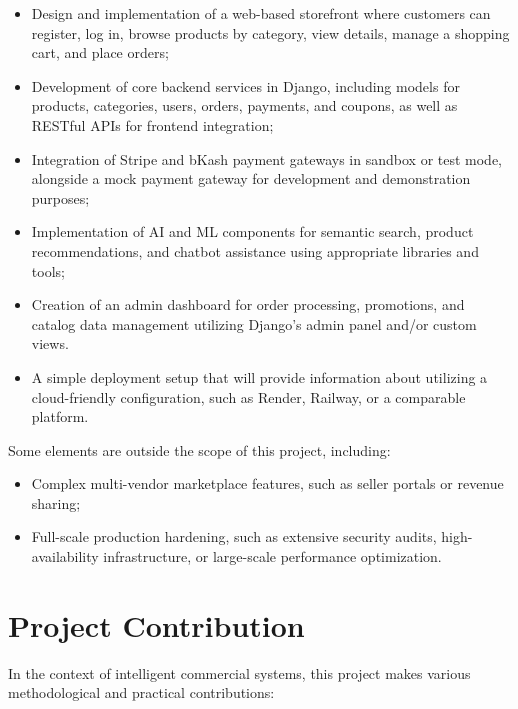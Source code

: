 \begin{itemize}
  \item Design and implementation of a web-based storefront where customers can register, log in, browse products by category, view details, manage a shopping cart, and place orders;
  \item Development of core backend services in Django, including models for products, categories, users, orders, payments, and coupons, as well as RESTful APIs for frontend integration;
  \item Integration of Stripe and bKash payment gateways in sandbox or test mode, alongside a mock payment gateway for development and demonstration purposes;
  \item Implementation of AI and ML components for semantic search, product recommendations, and chatbot assistance using appropriate libraries and tools;

  \item Creation of an admin dashboard for order processing, promotions, and catalog data management utilizing Django's admin panel and/or custom views.

  \item A simple deployment setup that will provide information about utilizing a cloud-friendly configuration, such as Render, Railway, or a comparable platform. 
\end{itemize}

Some elements are outside the scope of this project, including:
 \begin{itemize}
  \item Complex multi-vendor marketplace features, such as seller portals or revenue sharing;

  \item Full-scale production hardening, such as extensive security audits, high-availability infrastructure, or large-scale performance optimization.
\end{itemize}

\section{Project Contribution}

In the context of intelligent commercial systems, this project makes various methodological and practical contributions:


